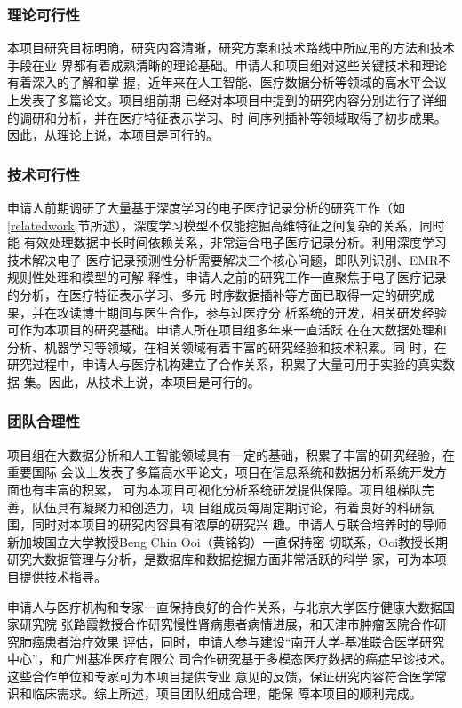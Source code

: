 \subsubsection{理论可行性}

本项目研究目标明确，研究内容清晰，研究方案和技术路线中所应用的方法和技术手段在业
界都有着成熟清晰的理论基础。申请人和项目组对这些关键技术和理论有着深入的了解和掌
握，近年来在人工智能、医疗数据分析等领域的高水平会议上发表了多篇论文。项目组前期
已经对本项目中提到的研究内容分别进行了详细的调研和分析，并在医疗特征表示学习、时
间序列插补等领域取得了初步成果。因此，从理论上说，本项目是可行的。

\subsubsection{技术可行性}

申请人前期调研了大量基于深度学习的电子医疗记录分析的研究工作（如
\ref{relatedwork}节所述），深度学习模型不仅能挖掘高维特征之间复杂的关系，同时能
有效处理数据中长时间依赖关系，非常适合电子医疗记录分析。利用深度学习技术解决电子
医疗记录预测性分析需要解决三个核心问题，即队列识别、EMR不规则性处理和模型的可解
释性，申请人之前的研究工作一直聚焦于电子医疗记录的分析，在医疗特征表示学习、多元
时序数据插补等方面已取得一定的研究成果，并在攻读博士期间与医生合作，参与过医疗分
析系统的开发，相关研发经验可作为本项目的研究基础。申请人所在项目组多年来一直活跃
在在大数据处理和分析、机器学习等领域，在相关领域有着丰富的研究经验和技术积累。同
时，在研究过程中，申请人与医疗机构建立了合作关系，积累了大量可用于实验的真实数据
集。因此，从技术上说，本项目是可行的。

\subsubsection{团队合理性}

项目组在大数据分析和人工智能领域具有一定的基础，积累了丰富的研究经验，在重要国际
会议上发表了多篇高水平论文，项目在信息系统和数据分析系统开发方面也有丰富的积累，
可为本项目可视化分析系统研发提供保障。项目组梯队完善，队伍具有凝聚力和创造力，项
目组成员每周定期讨论，有着良好的科研氛围，同时对本项目的研究内容具有浓厚的研究兴
趣。申请人与联合培养时的导师新加坡国立大学教授Beng Chin Ooi（黄铭钧）一直保持密
切联系，Ooi教授长期研究大数据管理与分析，是数据库和数据挖掘方面非常活跃的科学
家，可为本项目提供技术指导。

申请人与医疗机构和专家一直保持良好的合作关系，与北京大学医疗健康大数据国家研究院
张路霞教授合作研究慢性肾病患者病情进展，和天津市肿瘤医院合作研究肺癌患者治疗效果
评估，同时，申请人参与建设“南开大学-基准联合医学研究中心”，和广州基准医疗有限公
司合作研究基于多模态医疗数据的癌症早诊技术。这些合作单位和专家可为本项目提供专业
意见的反馈，保证研究内容符合医学常识和临床需求。综上所述，项目团队组成合理，能保
障本项目的顺利完成。